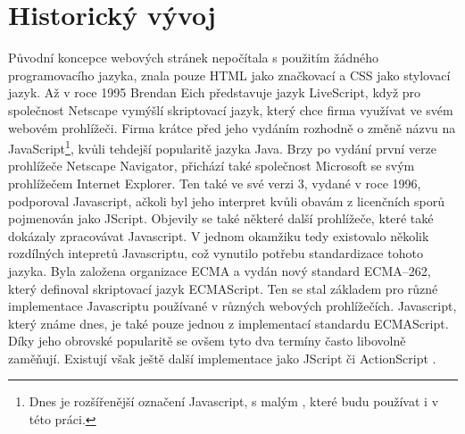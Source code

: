 \section{Historický vývoj}
Původní koncepce webových stránek nepočítala s použitím žádného programovacího jazyka, znala pouze HTML jako značkovací a CSS jako stylovací jazyk. Až v roce 1995 Brendan Eich představuje jazyk LiveScript, když pro společnost Netscape vymýšlí skriptovací jazyk, který chce firma využívat ve svém webovém prohlížeči. Firma krátce před jeho vydáním rozhodně o změně názvu na JavaScript\footnote{Dnes je rozšířenější označení Javascript, s malým , které budu používat i v této práci.}, kvůli tehdejší popularitě jazyka Java. Brzy po vydání první verze prohlížeče Netscape Navigator, přichází také společnost Microsoft se svým prohlížečem Internet Explorer. Ten také ve své verzi 3, vydané v roce 1996, podporoval Javascript, ačkoli byl jeho interpret kvůli obavám z licenčních sporů pojmenován jako JScript. Objevily se také některé další prohlížeče, které také dokázaly zpracovávat Javascript. V jednom okamžiku tedy existovalo několik rozdílných intepretů Javascriptu, což vynutilo potřebu standardizace tohoto jazyka. Byla založena organizace ECMA a vydán nový standard ECMA–262, který definoval skriptovací jazyk ECMAScript. Ten se stal základem pro různé implementace Javascriptu používané v různých webových prohlížečích. Javascript, který známe dnes, je také pouze jednou z implementací standardu ECMAScript. Díky jeho obrovské popularitě se ovšem tyto dva termíny často libovolně zaměňují. Existují však ještě další implementace jako JScript či ActionScript \cite{zakas_js} \cite{flanagan_javascript} \cite{hronek_javascript} .

